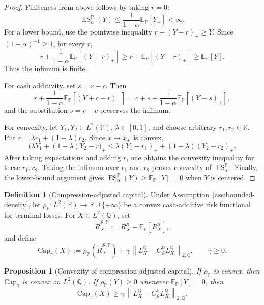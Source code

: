\documentclass[11pt,a4paper]{amsart}
\theoremstyle{plain}
\newtheorem{proposition}[theorem]{Proposition}
\theoremstyle{definition}
\newtheorem{definition}[theorem]{Definition}
\theoremstyle{remark}
\newcommand{\R}{\mathbb{R}}
\newcommand{\PP}{\mathbb{P}}
\newcommand{\QQ}{\mathbb{Q}}
\newcommand{\EE}{\mathbb{E}}
\newcommand{\cS}{\mathcal{S}}
\newcommand{\norm}[1]{\left\lVert #1\right\rVert}
\newcommand{\ES}{\operatorname{ES}}
\begin{document}
\begin{proof}
Finiteness from above follows by taking \(r=0\):
\[
        \ES_\alpha^\PP(Y)
        \le
        \frac{1}{1-\alpha}\EE_\PP[Y_+]
        <
        \infty.
\]
For a lower bound, use the pointwise inequality \(r+(Y-r)_+\ge Y\).  Since
\((1-\alpha)^{-1}\ge1\), for every \(r\),
\[
        r+\frac{1}{1-\alpha}\EE_\PP[(Y-r)_+]
        \ge
        r+\EE_\PP[(Y-r)_+]
        \ge
        \EE_\PP[Y].
\]
Thus the infimum is finite.

For cash additivity, set \(s=r-c\).  Then
\[
        r+\frac{1}{1-\alpha}\EE_\PP[(Y+c-r)_+]
        =
        c+s+\frac{1}{1-\alpha}\EE_\PP[(Y-s)_+],
\]
and the substitution \(s=r-c\) preserves the infimum.

For convexity, let \(Y_1,Y_2\in L^2(\PP)\), \(\lambda\in[0,1]\), and choose arbitrary
\(r_1,r_2\in\R\).  Put \(r=\lambda r_1+(1-\lambda)r_2\).  Since \(x\mapsto x_+\) is convex,
\[
        \bigl(\lambda Y_1+(1-\lambda)Y_2-r\bigr)_+
        \le
        \lambda(Y_1-r_1)_+
        +
        (1-\lambda)(Y_2-r_2)_+.
\]
After taking expectations and adding \(r\), one obtains the convexity inequality for these
\(r_1,r_2\).  Taking the infimum over \(r_1\) and \(r_2\) proves convexity of
\(\ES_\alpha^\PP\).  Finally, the lower-bound argument gives
\(\ES_\alpha^\PP(Y)\ge\EE_\PP[Y]=0\) when \(Y\) is centered.
\end{proof}

\begin{definition}[Compression-adjusted capital]\label{def:capital}
Under Assumption~\ref{ass:bounded-density}, let
\(\rho_\PP:L^2(\PP)\to\R\cup\{+\infty\}\) be a convex cash-additive risk functional for terminal
losses.  For \(X\in L^2(\QQ)\), set
\[
        \widetilde R_X^{\cS,\PP}
        :=
        R_X^{\cS}-\EE_\PP[R_X^{\cS}],
\]
and define
\[
        \mathrm{Cap}_{\gamma}(X)
        :=
        \rho_\PP\!\left(\widetilde R_X^{\cS,\PP}\right)
        +
        \gamma\,\norm{L_X^\QQ-C_{\cS}^{\QQ}L_X^\QQ}_{2,\QQ},
        \qquad \gamma\ge0.
\]
\end{definition}

\begin{proposition}[Convexity of compression-adjusted capital]\label{prop:capital-convex}
If \(\rho_\PP\) is convex, then \(\mathrm{Cap}_{\gamma}\) is convex on \(L^2(\QQ)\).  If
\(\rho_\PP(Y)\ge0\) whenever \(\EE_\PP[Y]=0\), then
\[
        \mathrm{Cap}_{\gamma}(X)
        \ge
        \gamma\,\norm{L_X^\QQ-C_{\cS}^{\QQ}L_X^\QQ}_{2,\QQ}.
\]
\end{proposition}
\end{document}
